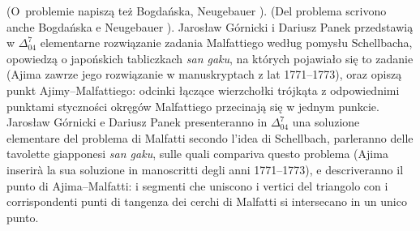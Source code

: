 (O~problemie napiszą też Bogdańska, Neugebauer \cite[s. 102]{neugebauer_2018}). %
(Del problema scrivono anche Bogdańska e Neugebauer \cite[p. 102]{neugebauer_2018}). %
Jarosław Górnicki i Dariusz Panek przedstawią w $\Delta_{04}^7$ elementarne rozwiązanie zadania Malfattiego według pomysłu Schellbacha, opowiedzą o japońskich tabliczkach \emph{san gaku}, na których pojawiało się to zadanie (Ajima zawrze jego rozwiązanie w manuskryptach z lat 1771--1773), oraz opiszą punkt Ajimy--Malfattiego: odcinki łączące wierzchołki trójkąta z odpowiednimi punktami styczności okręgów Malfattiego przecinają się w jednym punkcie. %
Jarosław Górnicki e Dariusz Panek presenteranno in $\Delta_{04}^7$ una soluzione elementare del problema di Malfatti secondo l'idea di Schellbach, parleranno delle tavolette giapponesi \emph{san gaku}, sulle quali compariva questo problema (Ajima inserirà la sua soluzione in manoscritti degli anni 1771--1773), e descriveranno il punto di Ajima--Malfatti: i segmenti che uniscono i vertici del triangolo con i corrispondenti punti di tangenza dei cerchi di Malfatti si intersecano in un unico punto. %

